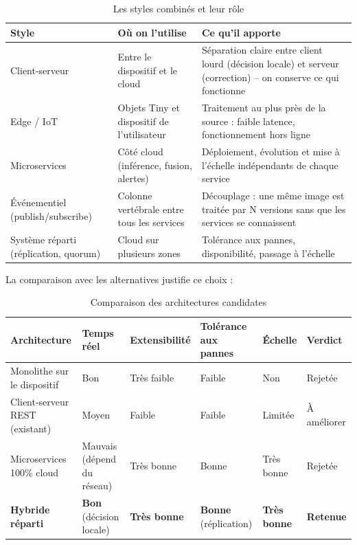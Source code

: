 \documentclass[11pt,a4paper]{article}
\begin{document}
\begin{table}[h]
\centering
\begin{tabular}{|p{3.6cm}|p{4.6cm}|p{6.4cm}|}
\hline
\textbf{Style} & \textbf{Où on l'utilise} & \textbf{Ce qu'il apporte} \\
\hline
Client-serveur & Entre le dispositif et le cloud & Séparation claire entre client lourd (décision locale) et serveur (correction) -- on conserve ce qui fonctionne \\
\hline
Edge / IoT & Objets Tiny et dispositif de l'utilisateur & Traitement au plus près de la source : faible latence, fonctionnement hors ligne \\
\hline
Microservices & Côté cloud (inférence, fusion, alertes) & Déploiement, évolution et mise à l'échelle indépendants de chaque service \\
\hline
Événementiel (publish/subscribe) & Colonne vertébrale entre tous les services & Découplage : une même image est traitée par N versions sans que les services se connaissent \\
\hline
Système réparti (réplication, quorum) & Cloud sur plusieurs zones & Tolérance aux pannes, disponibilité, passage à l'échelle \\
\hline
\end{tabular}
\caption{Les styles combinés et leur rôle}
\end{table}

La comparaison avec les alternatives justifie ce choix :

\begin{table}[h]
\centering
\begin{tabular}{|p{3.4cm}|p{1.9cm}|p{2.2cm}|p{2.3cm}|p{1.9cm}|p{2.0cm}|}
\hline
\textbf{Architecture} & \textbf{Temps réel} & \textbf{Extensibilité} & \textbf{Tolérance aux pannes} & \textbf{Échelle} & \textbf{Verdict} \\
\hline
Monolithe sur le dispositif & Bon & Très faible & Faible & Non & Rejetée \\
\hline
Client-serveur REST (existant) & Moyen & Faible & Faible & Limitée & À améliorer \\
\hline
Microservices 100\% cloud & Mauvais (dépend du réseau) & Très bonne & Bonne & Très bonne & Rejetée \\
\hline
\textbf{Hybride réparti} & \textbf{Bon} (décision locale) & \textbf{Très bonne} & \textbf{Bonne} (réplication) & \textbf{Très bonne} & \textbf{Retenue} \\
\hline
\end{tabular}
\caption{Comparaison des architectures candidates}
\end{table}
\end{document}
